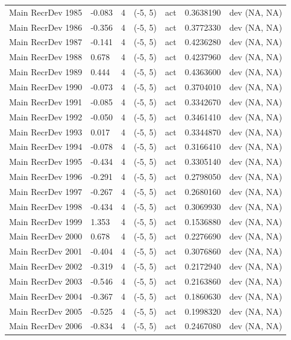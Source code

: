 \documentclass[
  english,
  a4paper,
]{article}
\begin{document}
\begin{landscape}
\begin{longtable}[t]{lllllll}
Main RecrDev 1985 & -0.083 & 4 & (-5, 5) & act & 0.3638190 & dev (NA, NA)\\
Main RecrDev 1986 & -0.356 & 4 & (-5, 5) & act & 0.3772330 & dev (NA, NA)\\
Main RecrDev 1987 & -0.141 & 4 & (-5, 5) & act & 0.4236280 & dev (NA, NA)\\
\addlinespace
Main RecrDev 1988 & 0.678 & 4 & (-5, 5) & act & 0.4237960 & dev (NA, NA)\\
Main RecrDev 1989 & 0.444 & 4 & (-5, 5) & act & 0.4363600 & dev (NA, NA)\\
Main RecrDev 1990 & -0.073 & 4 & (-5, 5) & act & 0.3704010 & dev (NA, NA)\\
Main RecrDev 1991 & -0.085 & 4 & (-5, 5) & act & 0.3342670 & dev (NA, NA)\\
Main RecrDev 1992 & -0.050 & 4 & (-5, 5) & act & 0.3461410 & dev (NA, NA)\\
\addlinespace
Main RecrDev 1993 & 0.017 & 4 & (-5, 5) & act & 0.3344870 & dev (NA, NA)\\
Main RecrDev 1994 & -0.078 & 4 & (-5, 5) & act & 0.3166410 & dev (NA, NA)\\
Main RecrDev 1995 & -0.434 & 4 & (-5, 5) & act & 0.3305140 & dev (NA, NA)\\
Main RecrDev 1996 & -0.291 & 4 & (-5, 5) & act & 0.2798050 & dev (NA, NA)\\
Main RecrDev 1997 & -0.267 & 4 & (-5, 5) & act & 0.2680160 & dev (NA, NA)\\
\addlinespace
Main RecrDev 1998 & -0.434 & 4 & (-5, 5) & act & 0.3069930 & dev (NA, NA)\\
Main RecrDev 1999 & 1.353 & 4 & (-5, 5) & act & 0.1536880 & dev (NA, NA)\\
Main RecrDev 2000 & 0.678 & 4 & (-5, 5) & act & 0.2276690 & dev (NA, NA)\\
Main RecrDev 2001 & -0.404 & 4 & (-5, 5) & act & 0.3076860 & dev (NA, NA)\\
Main RecrDev 2002 & -0.319 & 4 & (-5, 5) & act & 0.2172940 & dev (NA, NA)\\
\addlinespace
Main RecrDev 2003 & -0.546 & 4 & (-5, 5) & act & 0.2163860 & dev (NA, NA)\\
Main RecrDev 2004 & -0.367 & 4 & (-5, 5) & act & 0.1860630 & dev (NA, NA)\\
Main RecrDev 2005 & -0.525 & 4 & (-5, 5) & act & 0.1998320 & dev (NA, NA)\\
Main RecrDev 2006 & -0.834 & 4 & (-5, 5) & act & 0.2467080 & dev (NA, NA)\\

\end{longtable}
\end{landscape}
\end{document}
